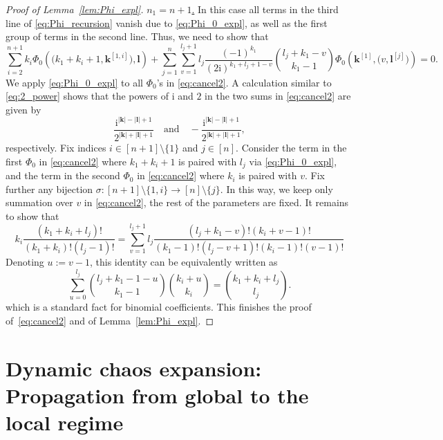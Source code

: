 \documentclass[10pt]{amsart}
\numberwithin{equation}{section}
\newcommand{\ii}{\mathrm{i}}
\begin{document}
\begin{proof}[Proof of Lemma~\ref{lem:Phi_expl}]
\smallskip

\noindent\underline{$n_1=n+1$.} In this case all terms in the third line of \eqref{eq:Phi_recursion} vanish due to \eqref{eq:Phi_0_expl}, as well as the first group of terms in the second line. Thus, we need to show that
\begin{equation}
\sum_{i=2}^{n+1} k_i \Phi_0\left(\big(k_1+k_i+1,\bm{k}^{[1,i]}\big),\bm{l}\right) + \sum_{j=1}^n \sum_{v=1}^{l_j+1} l_j\frac{(-1)^{k_1}}{(2\ii)^{k_1+l_j+1-v}}\binom{l_j+k_1-v}{k_1-1}\Phi_0\left(\bm{k}^{[1]},\big(v,\bm{l}^{[j]}\big)\right) = 0.
\label{eq:cancel2}
\end{equation}
We apply \eqref{eq:Phi_0_expl} to all $\Phi_0$'s in \eqref{eq:cancel2}. A calculation similar to \eqref{eq:2_power} shows that the powers of $\ii$ and $2$ in the two sums in \eqref{eq:cancel2} are given by
\begin{equation}
\frac{\ii^{|\bm{k}|-|\bm{l}|+1}}{2^{|\bm{k}|+|\bm{l}|+1}}\quad\text{and}\quad -\frac{\ii^{|\bm{k}|-|\bm{l}|+1}}{2^{|\bm{k}|+|\bm{l}|+1}},
\end{equation}
respectively. Fix indices $i\in [n+1]\setminus\{1\}$ and $j\in [n]$. Consider the term in the first $\Phi_0$ in \eqref{eq:cancel2} where $k_1+k_i+1$ is paired with $l_j$ via \eqref{eq:Phi_0_expl}, and the term in the second $\Phi_0$ in \eqref{eq:cancel2} where $k_i$ is paired with $v$. Fix further any bijection $\sigma: [n+1]\setminus\{1,i\} \to [n]\setminus\{j\}$. In this
way, we keep only summation over $v$ in \eqref{eq:cancel2}, the rest of the parameters are fixed. It remains to show that
\begin{equation}
k_i\frac{(k_1+k_i+l_j)!}{(k_1+k_i)!(l_j-1)!}=\sum_{v=1}^{l_j+1}l_j \frac{(l_j+k_1-v)!(k_i+v-1)!}{(k_1-1)!(l_j-v+1)!(k_i-1)!(v-1)!}
\end{equation}
Denoting $u:=v-1$, 
this identity can be equivalently written as
\begin{equation}
\sum_{u=0}^{l_j} \binom{l_j+k_1-1-u}{k_1-1}\binom{k_i+u}{k_i} = \binom{k_1+k_i+l_j}{l_j}.
\label{eq:binom_id}
\end{equation}
which is a standard fact for binomial coefficients. This finishes the proof of~\eqref{eq:cancel2} and of Lemma~\ref{lem:Phi_expl}.
\end{proof}



\section{Dynamic chaos expansion: Propagation from global to the local regime}\label{sec:dynamic_expansion}
\end{document}
